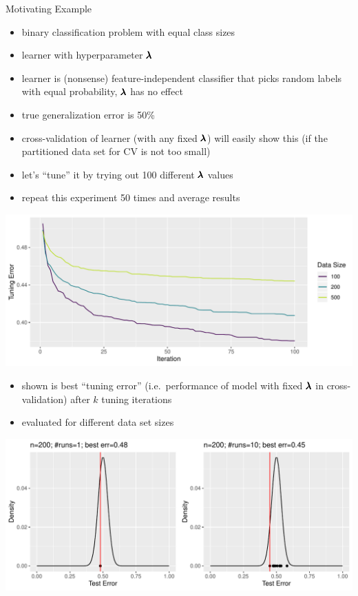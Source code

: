     \begin{frame}[c,allowframebreaks]{Motivating Example}
    \begin{itemize}
        \item binary classification problem with equal class sizes
        \item learner with hyperparameter $\pmb{\lambda}$
        \item learner is (nonsense) feature-independent classifier that picks
            random labels with equal probability,
              $\pmb{\lambda}$ has no effect
        \item true generalization error is 50\%
        \item cross-validation of learner (with any fixed $\pmb{\lambda}$) will easily show this
          (if the partitioned data set for CV is not too small)
        \item let's ``tune'' it by trying out 100 different $\pmb{\lambda}$ values
        \item repeat this experiment 50 times and average results
    \end{itemize}

    \framebreak

    \begin{center}
        \includegraphics[height=.5\textheight]{example-nested-resampling}
    \end{center}

    \begin{itemize}
    \item shown is best ``tuning error'' (i.e.\ performance of
        model with fixed $\pmb{\lambda}$ in cross-validation) after $k$ tuning iterations
    \item evaluated for different data set sizes
    \end{itemize}

    \begin{center}
        \includegraphics[height=.6\textheight]{dist-tuning1}
    \end{center}


\end{frame}

